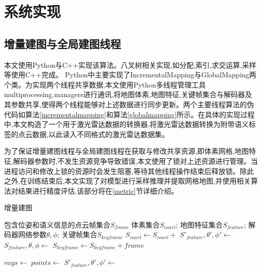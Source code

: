 \section{系统实现}\label{implement}
\subsection{增量建图与全局建图线程}
本文使用Python与C++实现该算法。八叉树相关实现,如分配,索引,求交运算,采样等使用C++完成。 Python中主要实现了IncrementalMapping与GlobalMapping两个类。为实现两个线程共享数据,本文使用Python多线程管理工具multiprocessing.managers进行通讯,将地图体素,地图特征,关键帧集合与解码器及其参数共享,使得两个线程能够对上述数据进行同步更新。两个主要线程算法的伪代码如算法\ref{incrementalmapping}和算法\ref{globalmapping}所示。在具体的实现过程中,本文构造了一个用于激光雷达数据的转换器,将激光雷达数据转换为附带语义标签的点云数据,以此读入不同格式的激光雷达数据集。

为了保证增量建图线程与全局建图线程在获取与修改共享资源,即体素网格,地图特征,解码器参数时,不发生资源竞争导致错误,本文使用了锁对上述资源进行管理。当进程访问和修改上锁的资源时会发生阻塞,等待其他线程操作结束后释放锁。除此之外,在训练结束后,本文实现了对模型进行采样推理并提取网格地图,并使用相关算法对结果进行精度评估,该部分将在\ref{metric}节详细介绍。
\begin{algorithm}
    \caption{增量建图}\label{incrementalmapping}
    \begin{algorithmic}[1]
      \Require
        包含位姿和语义信息的点云帧集合$S_{frame}$
      \Ensure
        体素集合$S_{voxel}$;
        地图特征集合$S_{feature}$;
        解码器网络参数$\theta, \phi$;
        关键帧集合$S_{keyframe}$
      \State $S_{voxel}\gets S_{voxel}+$ 
      \State $S'_{feature}, \theta', \phi'\gets$
      \State $S_{feature},\theta,\phi\gets$
      \State $S_{keyframe}\gets S_{keyframe}+frame$
      \EndIf
      \EndFor
      \State {}
      \EndFunction

      \State $rays \gets$
      \State $points\gets$
      \State {}
      \State $S'_{feature}, \theta', \phi'\gets$
      \EndIf
      \EndFor
      \State {}
      \EndFunction
    \end{algorithmic}
\end{algorithm}

